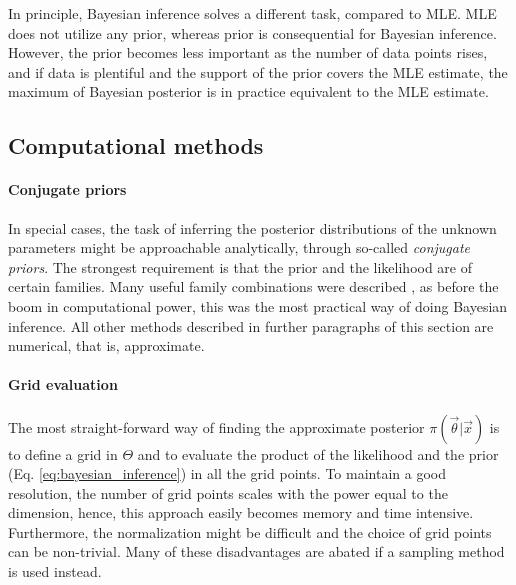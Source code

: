 In principle, Bayesian inference solves a different task, compared to MLE. MLE does not utilize any prior, whereas prior is consequential for Bayesian inference. However, the prior becomes less important as the number of data points rises, and if data is plentiful and the support of the prior covers the MLE estimate, the maximum of Bayesian posterior is in practice equivalent to the MLE estimate.

\subsection{Computational methods}

\paragraph{Conjugate priors}
In special cases, the task of inferring the posterior distributions of the unknown parameters might be approachable analytically, through so-called \textit{conjugate priors}. The strongest requirement is that the prior and the likelihood are of certain families. Many useful family combinations were described \cite{fink1997compendium}, as before the boom in computational power, this was the most practical way of doing Bayesian inference. All other methods described in further paragraphs of this section are numerical, that is, approximate.

\paragraph{Grid evaluation}
The most straight-forward way of finding the approximate posterior $\pi(\vec{\theta}|\vec{x})$ is to define a grid in $\Theta$ and to evaluate the product of the likelihood and the prior (Eq. \ref{eq:bayesian_inference}) in all the grid points. To maintain a good resolution, the number of grid points scales with the power equal to the dimension, hence, this approach easily becomes memory and time intensive. Furthermore, the normalization might be difficult and the choice of grid points can be non-trivial. Many of these disadvantages are abated if a sampling method is used instead. 

